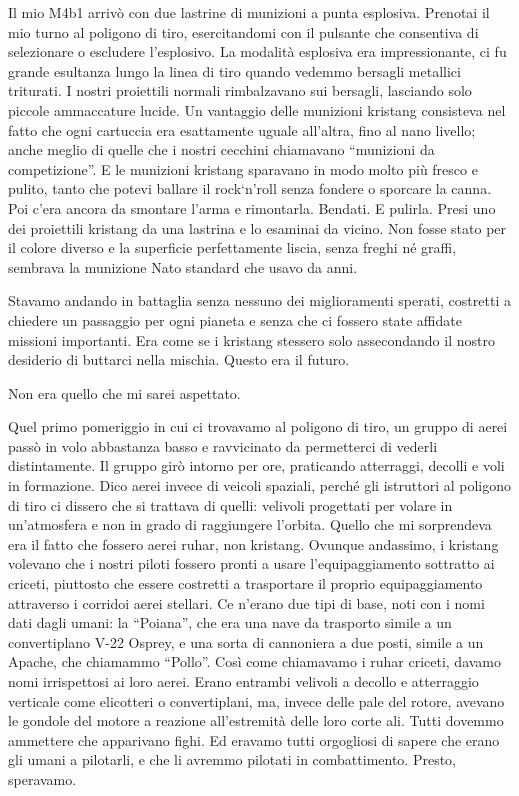 Il mio M4b1 arrivò con due lastrine di munizioni a punta esplosiva.
Prenotai il mio turno al poligono di tiro, esercitandomi con il pulsante
che consentiva di selezionare o escludere l'esplosivo. La modalità
esplosiva era impressionante, ci fu grande esultanza lungo la linea di
tiro quando vedemmo bersagli metallici triturati. I nostri proiettili
normali rimbalzavano sui bersagli, lasciando solo piccole ammaccature
lucide. Un vantaggio delle munizioni kristang consisteva nel fatto che
ogni cartuccia era esattamente uguale all'altra, fino al nano livello;
anche meglio di quelle che i nostri cecchini chiamavano ``munizioni da
competizione''. E le munizioni kristang sparavano in modo molto più
fresco e pulito, tanto che potevi ballare il rock`n'roll senza fondere o
sporcare la canna. Poi c'era ancora da smontare l'arma e rimontarla.
Bendati. E pulirla. Presi uno dei proiettili kristang da una lastrina e
lo esaminai da vicino. Non fosse stato per il colore diverso e la
superficie perfettamente liscia, senza freghi né graffi, sembrava la
munizione Nato standard che usavo da anni.

Stavamo andando in battaglia senza nessuno dei miglioramenti sperati,
costretti a chiedere un passaggio per ogni pianeta e senza che ci
fossero state affidate missioni importanti. Era come se i kristang
stessero solo assecondando il nostro desiderio di buttarci nella
mischia. Questo era il futuro.

Non era quello che mi sarei aspettato.

\hfill\break

Quel primo pomeriggio in cui ci trovavamo al poligono di tiro, un gruppo
di aerei passò in volo abbastanza basso e ravvicinato da permetterci di
vederli distintamente. Il gruppo girò intorno per ore, praticando
atterraggi, decolli e voli in formazione. Dico aerei invece di veicoli
spaziali, perché gli istruttori al poligono di tiro ci dissero che si
trattava di quelli: velivoli progettati per volare in un'atmosfera e non
in grado di raggiungere l'orbita. Quello che mi sorprendeva era il fatto
che fossero aerei ruhar, non kristang. Ovunque andassimo, i kristang
volevano che i nostri piloti fossero pronti a usare l'equipaggiamento
sottratto ai criceti, piuttosto che essere costretti a trasportare il
proprio equipaggiamento attraverso i corridoi aerei stellari. Ce n'erano
due tipi di base, noti con i nomi dati dagli umani: la ``Poiana'', che
era una nave da trasporto simile a un convertiplano V-22 Osprey, e una
sorta di cannoniera a due posti, simile a un Apache, che chiamammo
``Pollo''. Così come chiamavamo i ruhar criceti, davamo nomi
irrispettosi ai loro aerei. Erano entrambi velivoli a decollo e
atterraggio verticale come elicotteri o convertiplani, ma, invece delle
pale del rotore, avevano le gondole del motore a reazione all'estremità
delle loro corte ali. Tutti dovemmo ammettere che apparivano fighi. Ed
eravamo tutti orgogliosi di sapere che erano gli umani a pilotarli, e
che li avremmo pilotati in combattimento. Presto, speravamo.


